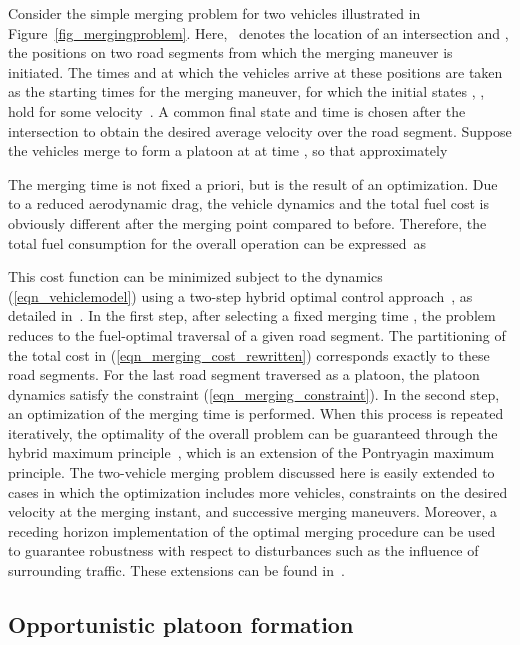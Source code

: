 \documentclass[journal]{IEEEtran}
\begin{document}
Consider the simple merging problem for two vehicles  illustrated in Figure~\ref{fig_mergingproblem}. Here,~ denotes the location of an intersection and ,  the positions on two road segments from which the merging maneuver is initiated. The times  and   at which the vehicles arrive at these positions are taken as the starting times for the merging maneuver, for which the initial states , , hold for some
velocity~. A common final state  and time  is chosen after the intersection to obtain the desired average velocity over the road segment. Suppose the vehicles merge to form a platoon at  at time , so that approximately

The merging time  is not fixed a priori, but is the result of an optimization. Due to a reduced aerodynamic drag, the vehicle dynamics and the total fuel cost is obviously different after the merging point compared to before. Therefore, the total fuel consumption for the overall operation can be expressed~as

This cost function can be minimized subject to the dynamics (\ref{eqn_vehiclemodel}) using a two-step hybrid optimal control approach~\cite{sussmann_1999,shaikh_2007}, as detailed in~\cite{koller_2015}. In the first step, after selecting a fixed merging time , the problem reduces to the fuel-optimal traversal of a given road segment. The partitioning of the total cost in (\ref{eqn_merging_cost_rewritten}) corresponds exactly to these road segments. For the last road segment traversed as a platoon, the platoon dynamics satisfy the constraint (\ref{eqn_merging_constraint}). In the second step, an optimization of the merging time  is performed. When this process is repeated iteratively, the optimality of the overall problem can be guaranteed through the hybrid maximum principle~\cite{sussmann_1999}, which is an extension of the Pontryagin maximum principle. The two-vehicle merging problem discussed here is easily extended to cases in which the optimization includes more vehicles, constraints on the desired velocity at the merging instant, and successive merging
maneuvers. Moreover, a receding horizon implementation of the optimal merging procedure can be used to guarantee robustness with respect to disturbances such as the influence of surrounding traffic. These extensions can be found in~\cite{koller_2015}.


\subsection{Opportunistic platoon formation}\label{sec_opportunisticplatoonformation}
\end{document}
